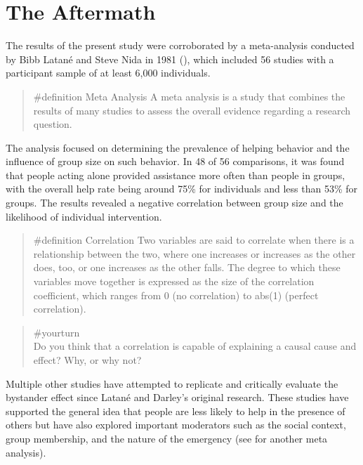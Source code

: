 \documentclass[
  letterpaper,
]{book}
\begin{document}
\section{The Aftermath}\label{the-aftermath-18}

The results of the present study were corroborated by a meta-analysis
conducted by Bibb Latané and Steve Nida in 1981
(), which included
56 studies with a participant sample of at least 6,000 individuals.

\begin{quote}
\label{def-metaanalysis}{\#definition} Meta Analysis A
meta analysis is a study that combines the results of many studies to
assess the overall evidence regarding a research question.
\end{quote}

The analysis focused on determining the prevalence of helping behavior
and the influence of group size on such behavior. In 48 of 56
comparisons, it was found that people acting alone provided assistance
more often than people in groups, with the overall help rate being
around 75\% for individuals and less than 53\% for groups. The results
revealed a negative correlation between group size and the likelihood of
individual intervention.

\begin{quote}
\label{def-correlation}{\#definition} Correlation Two
variables are said to correlate when there is a relationship between the
two, where one increases or increases as the other does, too, or one
increases as the other falls. The degree to which these variables move
together is expressed as the size of the correlation coefficient, which
ranges from 0 (no correlation) to abs(1) (perfect correlation).
\end{quote}

\begin{quote}
{\#yourturn}\\
Do you think that a correlation is capable of explaining a causal cause
and effect? Why, or why not?
\end{quote}

Multiple other studies have attempted to replicate and critically
evaluate the bystander effect since Latané and Darley's original
research. These studies have supported the general idea that people are
less likely to help in the presence of others but have also explored
important moderators such as the social context, group membership, and
the nature of the emergency (see
 for
another meta analysis).
\end{document}
